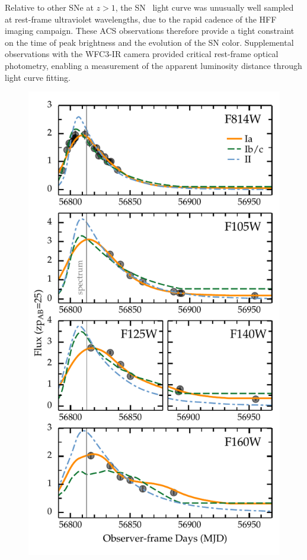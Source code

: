 Relative to other SNe at $z>1$, the SN \tomas\ light curve was
unusually well sampled at rest-frame ultraviolet wavelengths, due to
the rapid cadence of the HFF imaging campaign. These ACS observations
therefore provide a tight constraint on the time of peak brightness
and the evolution of the SN color.  Supplemental observations with the
WFC3-IR camera provided critical rest-frame optical photometry,
enabling a measurement of the apparent luminosity distance through
light curve fitting.

\begin{figure}
\begin{center}
\includegraphics[width=\columnwidth]{snTomas_lightcurve_classification}

\end{center}
\end{figure}
